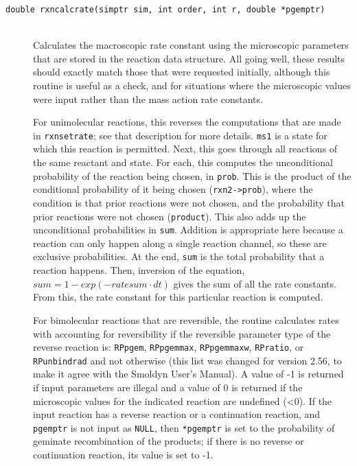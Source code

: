 \documentclass {scrbook}
\newcommand {\ttt} {\texttt}
\begin{document}
\begin{description}
\item[\ttt{double rxncalcrate(simptr sim, int order, int r, double *pgemptr)}]
\hfill \\
Calculates the macroscopic rate constant using the microscopic parameters that are stored in the reaction data structure. All going well, these results should exactly match those that were requested initially, although this routine is useful as a check, and for situations where the microscopic values were input rather than the mass action rate constants.

For unimolecular reactions, this reverses the computations that are made in \ttt{rxnsetrate}; see that description for more details. \ttt{ms1} is a state for which this reaction is permitted. Next, this goes through all reactions of the same reactant and state. For each, this computes the unconditional probability of the reaction being chosen, in \ttt{prob}. This is the product of the conditional probability of it being chosen (\ttt{rxn2->prob}), where the condition is that prior reactions were not chosen, and the probability that prior reactions were not chosen (\ttt{product}). This also adds up the unconditional probabilities in \ttt{sum}. Addition is appropriate here because a reaction can only happen along a single reaction channel, so these are exclusive probabilities. At the end, \ttt{sum} is the total probability that a reaction happens. Then, inversion of the equation, $sum=1-exp(-ratesum \cdot dt)$ gives the sum of all the rate constants. From this, the rate constant for this particular reaction is computed.

For bimolecular reactions that are reversible, the routine calculates rates with accounting for reversibility if the reversible parameter type of the reverse reaction is: \ttt{RPpgem}, \ttt{RPpgemmax}, \ttt{RPpgemmaxw}, \ttt{RPratio}, or \ttt{RPunbindrad} and not otherwise (this list was changed for version 2.56, to make it agree with the Smoldyn User's Manual). A value of -1 is returned if input parameters are illegal and a value of 0 is returned if the microscopic values for the indicated reaction are undefined (<0). If the input reaction has a reverse reaction or a continuation reaction, and \ttt{pgemptr} is not input as \ttt{NULL}, then \ttt{*pgemptr} is set to the probability of geminate recombination of the products; if there is no reverse or continuation reaction, its value is set to -1.


\end{description}
\end{document}
